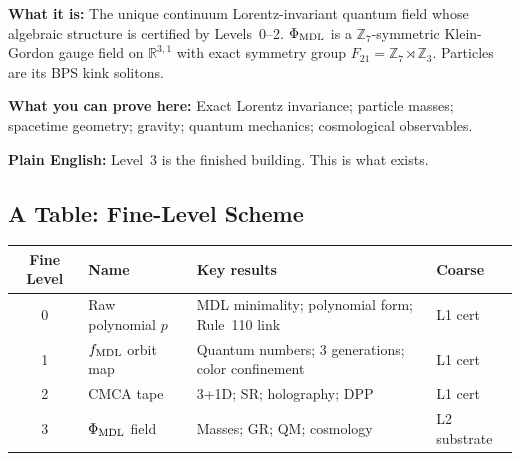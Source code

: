 \documentclass[11pt,a4paper]{article}
\newcommand{\PhiMDL}{\Phi_{\rm MDL}}
\newcommand{\ZS}{\mathbb{Z}_7}
\newcommand{\poly}{p}
\newcommand{\fMDL}{f_{\rm MDL}}
\begin{document}
\begin{tcolorbox}[colback=levthree,colframe=purple!50!black,
  title=Level 3 --- The Continuum Field ($\Phi_{\rm MDL}$)]
\textbf{What it is:} The unique continuum Lorentz-invariant quantum field
whose algebraic structure is certified by Levels~0--2.
$\PhiMDL$ is a $\ZS$-symmetric Klein-Gordon gauge field on $\mathbb{R}^{3,1}$
with exact symmetry group $F_{21} = \ZS\rtimes\mathbb{Z}_3$.
Particles are its BPS kink solitons.

\medskip\noindent
\textbf{What you can prove here:}
Exact Lorentz invariance; particle masses; spacetime geometry; gravity;
quantum mechanics; cosmological observables.

\medskip\noindent
\textbf{Plain English:}
Level~3 is the finished building.
This is what exists.
\end{tcolorbox}

\subsection{A Table: Fine-Level Scheme}

\bigskip
\begin{center}
\begin{tabular}{@{}clp{6.2cm}l@{}}
\toprule
\textbf{Fine Level} & \textbf{Name} & \textbf{Key results} & \textbf{Coarse} \\
\midrule
0 & Raw polynomial $\poly$ & MDL minimality; polynomial form; Rule~110 link & L1 cert \\
1 & $\fMDL$ orbit map & Quantum numbers; 3 generations; color confinement & L1 cert \\
2 & CMCA tape & 3+1D; SR; holography; DPP & L1 cert \\
3 & $\PhiMDL$ field & Masses; GR; QM; cosmology & L2 substrate \\
\bottomrule
\end{tabular}
\end{center}
\bigskip
\end{document}

